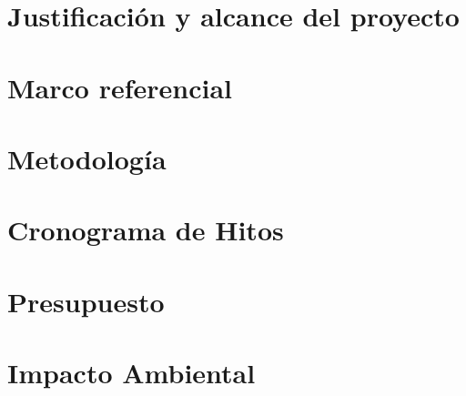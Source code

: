 \documentclass[letterpaper, 11pt, oneside]{book}
\begin{document}
\chapter{Justificación y alcance del proyecto}



\chapter{Marco referencial}









\chapter{Metodología}



\chapter{Cronograma de Hitos}



\chapter{Presupuesto}



\chapter{Impacto Ambiental}

\end{document}
